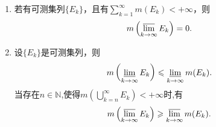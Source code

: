 \documentclass[../../main.tex]{subfiles}%
\begin{document}
\begin{theorem}[测度的Fatou引理]\label{theorem:测度的Fatou引理}
\begin{enumerate}[(1)]
\item\label{theorem:测度的Fatou引理-1} 若有可测集列$\{E_k\}$，且有$\sum_{k = 1}^{\infty}m(E_k)<+\infty$，则
\begin{align*}
m\left(\varlimsup_{k\to\infty}E_k\right)= 0.
\end{align*}

\item\label{theorem:测度的Fatou引理-2} 设$\{E_k\}$是可测集列，则
\begin{align*}
m\left(\varliminf_{k\to\infty}E_k\right)\leqslant\varliminf_{k\to\infty}m(E_k).
\end{align*}
当存在$n\in \mathbb{N}$,使得$m\left( \bigcup_{k=n}^{\infty}{E_k} \right) <+\infty$时,有
\begin{align*}
m\left(\varlimsup_{k\to\infty}E_k\right)\geqslant\varlimsup_{k\to\infty}m(E_k).
\end{align*}
\end{enumerate}
\end{theorem}
\end{document}
